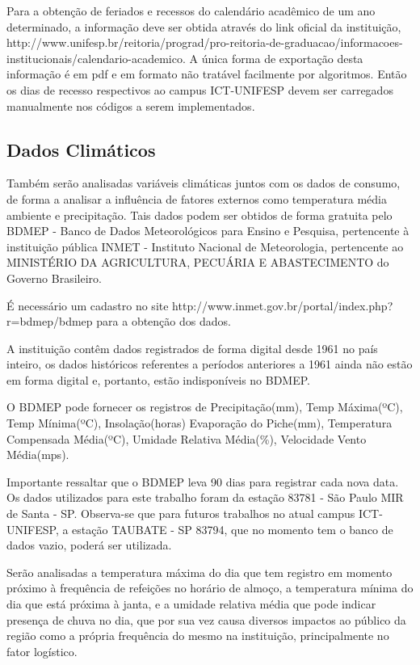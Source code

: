 \documentclass[	12pt, Times, openright, twoside, a4paper, english, brazil]{abntex2}
\begin{document}
Para a obtenção de feriados e recessos do calendário acadêmico de um ano determinado, a informação deve ser obtida através do link oficial da instituição, http://www.unifesp.br/reitoria/prograd/pro-reitoria-de-graduacao/informacoes-institucionais/calendario-academico. A única forma de exportação desta informação é em pdf e em formato não tratável facilmente por algoritmos. Então os dias de recesso respectivos ao campus ICT-UNIFESP devem ser carregados manualmente nos códigos a serem implementados.

\subsection{Dados Climáticos}
Também serão analisadas variáveis climáticas juntos com os dados de consumo, de forma a analisar a influência de fatores externos como temperatura média ambiente e precipitação. Tais dados podem ser obtidos de forma gratuita pelo BDMEP - Banco de Dados Meteorológicos para Ensino e Pesquisa, pertencente à instituição pública INMET - Instituto Nacional de Meteorologia, pertencente ao MINISTÉRIO DA AGRICULTURA, PECUÁRIA E ABASTECIMENTO do Governo Brasileiro. 

É necessário um cadastro no site http://www.inmet.gov.br/portal/index.php?r=bdmep/bdmep para a obtenção dos dados. 

A instituição contêm dados registrados de forma digital desde 1961 no país inteiro, os dados históricos referentes a períodos anteriores a 1961 ainda não estão em forma digital e, portanto, estão indisponíveis no BDMEP.

O BDMEP pode fornecer os registros de Precipitação(mm), Temp Máxima(ºC), Temp Mínima(ºC), Insolação(horas)
Evaporação do Piche(mm), Temperatura Compensada Média(ºC), Umidade Relativa Média(\%), Velocidade Vento Média(mps).

Importante ressaltar que o BDMEP leva 90 dias para registrar cada nova data.
Os dados utilizados para este trabalho foram da estação 83781 - São Paulo MIR de Santa - SP.
Observa-se que para futuros trabalhos no atual campus ICT-UNIFESP, a estação TAUBATE - SP 83794, que no momento tem o banco de dados vazio, poderá ser utilizada.

Serão analisadas a temperatura máxima do dia que tem registro em momento próximo à frequência de refeições no horário de almoço, a temperatura mínima do dia que está próxima à janta, e a umidade relativa média que pode indicar presença de chuva no dia, que por sua vez causa diversos impactos ao público da região como a própria frequência do mesmo na instituição, principalmente no fator logístico. 
\end{document}
